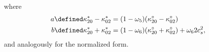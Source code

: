 where
\begin{equation*}
 \begin{aligned}
   a \defined \kappa_{20}^{*} - \kappa_{02}^{*}
     & = (1-\omega_5) (\kappa_{20}^{\circ}- \kappa_{02}^{\circ}) \\
   b \defined \kappa_{20}^{*} + \kappa_{02}^{*}
     & = (1-\omega_6)(\kappa_{20}^{\circ} + \kappa_{02}^{\circ}) + \omega_6 2 c_s^2,
 \end{aligned}
\end{equation*}
and analogously for the normalized form.
